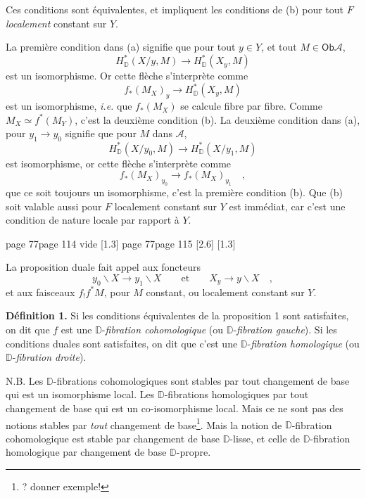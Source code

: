 \documentclass[11pt,leqno]{article}
\newcommand{\printedpage}[1]{\marginnote{\scriptsize\sffamily ed.\ #1}}
\newcommand{\msp}[1]{%
  \begingroup\def\thismsp{#1}\def\blankmsp{page 114 vide}%
  \ifx\thismsp\blankmsp
    \marginnote{\scriptsize\sffamily [114: vide]}[1.3\baselineskip]%
  \else\def\followingmsp{page 115}%
    \ifx\thismsp\followingmsp
      \marginnote{\scriptsize\sffamily [page 115]}[2.6\baselineskip]%
    \else\marginnote{\scriptsize\sffamily [#1]}[1.3\baselineskip]\fi
  \fi\endgroup}
\newcommand{\Ob}{\ensuremath{\mathsf{Ob}}}
\newcommand{\D}{\ensuremath{\mathbb{D}}}
\newcommand{\bs}{\backslash}
\begin{document}
Ces conditions sont équivalentes, et impliquent les conditions de (b) pour tout $F$ \textit{localement} constant sur $Y$.

La première condition dans (a) signifie que pour tout $y \in Y$, et tout $M \in \Ob \mathcal{A}$,
\[
H^*_{\D}(X/y, M) \longrightarrow H^*_{\D}(X_y, M)
\]
est un isomorphisme. Or cette flèche s'interprète comme
\[
f_*(M_X)_y \longrightarrow H^*_{\D}(X_y, M)
\]
est un isomorphisme, \textit{i.e.} que $f_*(M_X)$ se calcule fibre par fibre. Comme $M_X \simeq f^*(M_Y)$, c'est la deuxième condition (b). La deuxième condition dans (a), pour $y_1 \to y_0$ signifie que pour $M$ dans $\mathcal{A}$,
\[
H^*_{\D}(X/y_0, M) \longrightarrow H^*_{\D}(X/y_1, M)
\]
est isomorphisme, or cette flèche s'interprète comme
\[
f_*(M_X)_{y_0} \longrightarrow f_*(M_X)_{y_1} \quad ,
\]
que ce soit toujours un isomorphisme, c'est la première condition (b). Que (b) soit valable aussi pour $F$ localement constant sur $Y$ est immédiat, car c'est une condition de nature locale par rapport à $Y$.

\msp{page 77}

La proposition duale fait appel aux foncteurs
\[
y_0\bs X \longrightarrow y_1\bs X \qquad \text{et} \qquad X_y \longrightarrow y\bs X \quad ,
\]
et aux faisceaux $f_!f^*M$, pour $M$ constant, ou localement constant sur $Y$.

\printedpage{47}
\textbf{Définition 1.} Si les conditions équivalentes de la proposition 1 sont satisfaites, on dit que $f$ est une $\D$-\textit{fibration cohomologique} (ou $\D$-\textit{fibration gauche}). Si les conditions duales sont satisfaites, on dit que c'est une $\D$-\textit{fibration homologique} (ou $\D$-\textit{fibration droite}).

N.B. Les $\D$-fibrations cohomologiques sont stables par tout changement de base qui est un isomorphisme local. Les $\D$-fibrations homologiques par tout changement de base qui est un co-isomorphisme local. Mais ce ne sont pas des notions stables par \textit{tout} changement de base\footnote[34]{? donner exemple!}. Mais la notion de $\D$-fibration cohomologique est stable par changement de base $\D$-lisse, et celle de $\D$-fibration homologique par changement de base $\D$-propre.
\end{document}
